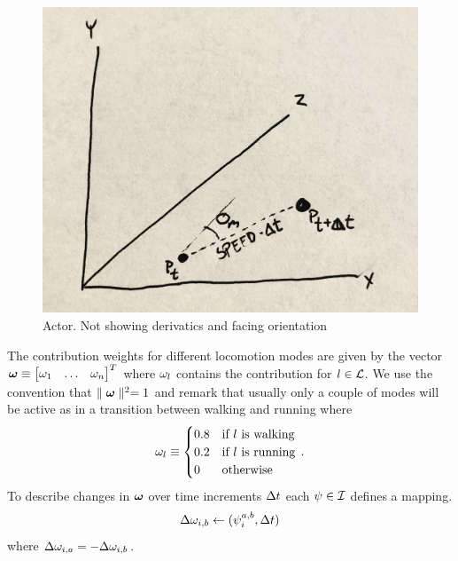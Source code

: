 \begin{figure}
    \centering
    \includegraphics[width=0.75\columnwidth]{img/actor.jpg}
    \caption{Actor. Not showing derivatics and facing orientation}
    \label{fig:actor}
\end{figure}
 The contribution weights for different locomotion modes are given by the vector $\boldsymbol{\omega } \equiv \begin{bmatrix}\omega_1 & \ldots & \omega_n \end{bmatrix}^T$ where $\omega_l$ contains the contribution for $l \in \mathcal{L}$. We use the convention that $\parallel {  \boldsymbol{\omega }  } \parallel^2 = 1$ and remark that usually only a couple of modes will be active as in a transition between walking and running where 
\begin{equation}
    \label{eq:contribusion:weight:example}
    \omega_l \equiv
    \begin{cases}
    0.8 & \text{if $l$ is walking} \\
    0.2 & \text{if $l$ is running} \\
    0 & \text{otherwise}
    \end{cases}\,.
\end{equation}
To describe changes in $\boldsymbol{\omega }$ over time increments $\Delta{t}$ each $\psi \in \mathcal{I}$ defines a mapping. 
\begin{equation}
\Delta{ \omega }_{i,b} \leftarrow (\psi_{i}^{a,b},\Delta{t})
\end{equation}
where $\Delta{ \omega }_{i,a}=-\Delta{ \omega }_{i,b}$.

